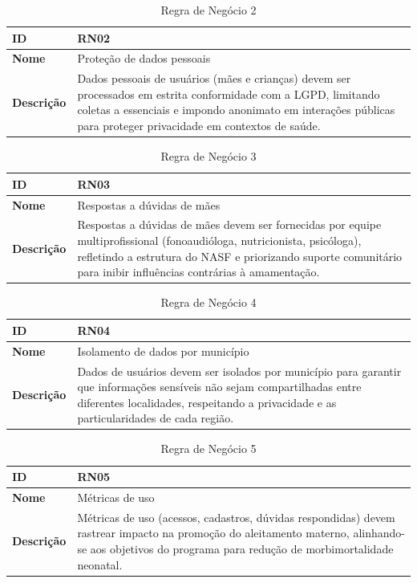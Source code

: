 \begin{table}[H]
\centering
\begin{tabular}{|l|p{12cm}|}
\hline
\textbf{ID} & RN02 \\
\hline
\textbf{Nome} & Proteção de dados pessoais \\
\hline
\textbf{Descrição} & Dados pessoais de usuários (mães e crianças) devem ser processados em estrita conformidade com a LGPD, limitando coletas a essenciais e impondo anonimato em interações públicas para proteger privacidade em contextos de saúde. \\
\hline
\end{tabular}
\caption[RN02 -- Proteção de dados pessoais]{Regra de Negócio 2}
\label{tab:rn02}
\end{table}

\begin{table}[H]
\centering
\begin{tabular}{|l|p{12cm}|}
\hline
\textbf{ID} & RN03 \\
\hline
\textbf{Nome} & Respostas a dúvidas de mães \\
\hline
\textbf{Descrição} & Respostas a dúvidas de mães devem ser fornecidas por equipe multiprofissional (fonoaudióloga, nutricionista, psicóloga), refletindo a estrutura do NASF e priorizando suporte comunitário para inibir influências contrárias à amamentação. \\
\hline
\end{tabular}
\caption[RN03 -- Respostas a dúvidas de mães]{Regra de Negócio 3}
\label{tab:rn03}
\end{table}

\begin{table}[H]
\centering
\begin{tabular}{|l|p{12cm}|}
\hline
\textbf{ID} & RN04 \\
\hline
\textbf{Nome} & Isolamento de dados por município \\
\hline
\textbf{Descrição} & Dados de usuários devem ser isolados por município para garantir que informações sensíveis não sejam compartilhadas entre diferentes localidades, respeitando a privacidade e as particularidades de cada região. \\
\hline
\end{tabular}
\caption[RN04 -- Isolamento de dados por município]{Regra de Negócio 4}
\label{tab:rn04}
\end{table}

\begin{table}[H]
\centering
\begin{tabular}{|l|p{12cm}|}
\hline
\textbf{ID} & RN05 \\
\hline
\textbf{Nome} & Métricas de uso \\
\hline
\textbf{Descrição} & Métricas de uso (acessos, cadastros, dúvidas respondidas) devem rastrear impacto na promoção do aleitamento materno, alinhando-se aos objetivos do programa para redução de morbimortalidade neonatal. \\
\hline
\end{tabular}
\caption[RN05 -- Métricas de uso]{Regra de Negócio 5}
\label{tab:rn05}
\end{table}

